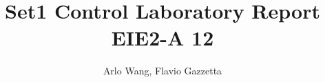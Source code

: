 \begin{frontmatter}
%
\title{%
Set1 Control Laboratory Report\\
\vspace{2pc}
\small EIE2-A 12  %
}
%
\author[]{Arlo Wang, Flavio Gazzetta} 
\renewcommand{\today}{} %
%
%
%


\end{frontmatter}
%
%
%

